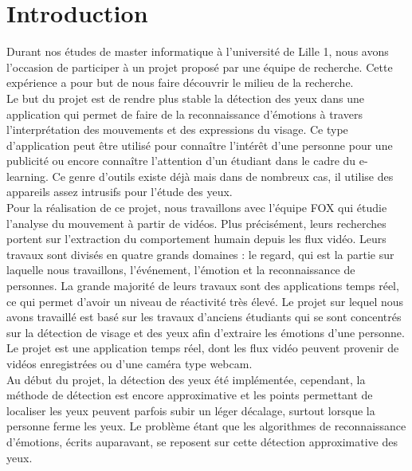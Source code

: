 \section*{Introduction}

Durant nos études de master informatique à l'université de Lille 1,
nous avons l'occasion de participer à un projet proposé par une équipe de
recherche. Cette expérience a pour but de nous faire découvrir le
milieu de la recherche.\\

Le but du projet est de rendre plus stable la détection des yeux dans une
application qui permet de faire de la reconnaissance d'émotions à
travers l'interprétation des mouvements et des expressions du visage. Ce type
d'application peut être utilisé pour connaître l'intérêt d'une
personne pour une publicité ou encore connaître l'attention d'un étudiant 
dans le cadre du e-learning. Ce genre d'outils existe déjà mais dans de nombreux cas, il
utilise des appareils assez intrusifs pour l'étude des yeux.\\

Pour la réalisation de ce projet, nous travaillons avec l'équipe FOX qui étudie
l'analyse du mouvement à partir de vidéos. Plus précisément, leurs recherches portent
sur l'extraction du comportement humain depuis les flux vidéo.  Leurs travaux sont
divisés en quatre grands domaines : le regard, qui est la partie sur
laquelle nous travaillons, l'événement, l'émotion et la
reconnaissance de personnes. La grande majorité de leurs travaux sont
des applications temps réel, ce qui permet d'avoir un niveau de
réactivité très élevé. Le projet sur lequel nous avons travaillé est
basé sur les travaux d'anciens étudiants qui se sont concentrés sur la
détection de visage et des yeux afin d'extraire les émotions d'une personne. 
Le projet est une application temps réel, dont les flux vidéo peuvent 
provenir de vidéos enregistrées ou d'une caméra type webcam.\\

Au début du projet, la détection des yeux été implémentée, cependant,
la méthode de détection est encore approximative et les points permettant de localiser
les yeux peuvent parfois subir un léger décalage, surtout lorsque 
la personne ferme les yeux. Le problème étant que les algorithmes de reconnaissance 
d'émotions, écrits auparavant, se reposent sur cette détection approximative des yeux.\\

